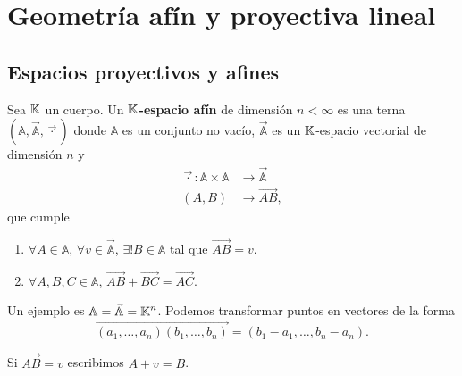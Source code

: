 \chapter{Geometría afín y proyectiva lineal}
\section{Espacios proyectivos y afines}
\begin{definition}
	Sea $\displaystyle \mathbb{K} $ un cuerpo. Un $\displaystyle \mathbb{K} $\textbf{-espacio afín} de dimensión $\displaystyle n < \infty $ es una terna $\displaystyle \left(\mathbb{A}, \vec{\mathbb{A}}, \vec{ \cdot}\right) $ donde $\displaystyle \mathbb{A} $ es un conjunto no vacío, $\displaystyle \vec{\mathbb{A}} $ es un $\displaystyle \mathbb{K} $-espacio vectorial de dimensión $\displaystyle n $ y 
	\[
	\begin{split}
		\vec{ \cdot} : \mathbb{A} \times \mathbb{A} & \to \vec{\mathbb{A}} \\
		\left(A,B\right) & \to \overrightarrow{AB},
	\end{split}
	\]
	que cumple 
	\begin{enumerate}
	\item $\displaystyle \forall A \in \mathbb{A} $, $\displaystyle \forall v \in \vec{\mathbb{A}} $, $\displaystyle \exists ! B \in \mathbb{A} $ tal que $\displaystyle \overrightarrow{AB} = v $. 
	\item $\displaystyle \forall A,B,C \in \mathbb{A} $, $\displaystyle \overrightarrow{AB} + \overrightarrow{BC} = \overrightarrow{AC} $.
	\end{enumerate}
\end{definition}
\begin{eg}
Un ejemplo es $\displaystyle \mathbb{A} = \vec{\mathbb{A}} = \mathbb{K}^{n} $. Podemos transformar puntos en vectores de la forma 
\[\overrightarrow{\left(a_{1}, \ldots, a_{n}\right)\left(b_{1}, \ldots, b_{n}\right)} = \left(b_{1}-a_{1}, \ldots, b_{n}-a_{n}\right) .\]
\end{eg}
\begin{notation}
Si $\displaystyle \overrightarrow{AB} = v $ escribimos $\displaystyle A + v = B $.
\end{notation}
